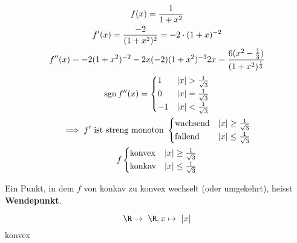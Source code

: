 \begin{bsp*}[note = cont.]
	\begin{gather*}
		f(x) = \frac{1}{1+x^2} \\
		f'(x) = \frac{-2}{(1+x^2)^2} = -2 \cdot (1+x)^{-2} \\
		f''(x) = -2(1+x^2)^{-2} - 2x (-2)(1+x^2)^{-3} 2x = \frac{6(x^2 - \frac{1}{3})}{(1+x^2)^{\frac{1}{3}}} \\
		\sgn f''(x) = \begin{cases}
			1	&\abs{x} > \frac{1}{\sqrt{3}}	\\
			0	&\abs{x} = \frac{1}{\sqrt{3}}	\\
			-1	&\abs{x} < \frac{1}{\sqrt{3}}	
		\end{cases} \\
		\implies f' \text{ ist streng monoton } \begin{cases}
			\text{wachsend}		&\abs{x} \geq \frac{1}{\sqrt{3}}	\\
			\text{fallend}		&\abs{x} \leq \frac{1}{\sqrt{3}}	
		\end{cases} \\
		f \begin{cases}
			\text{konvex}	&\abs{x} \geq \frac{1}{\sqrt{3}}	\\
			\text{konkav}	&\abs{x} \leq \frac{1}{\sqrt{3}} 	
		\end{cases}
	\end{gather*}
\end{bsp*}
\begin{def*}[note = Wendepunkt , index = Wendepunkt]
	Ein Punkt, in dem $f$ von konkav zu konvex wechselt (oder umgekehrt), heisst \textbf{Wendepunkt}. \\
\end{def*}
\begin{bsp*}
	\[ \R \rightarrow \R , x \mapsto \abs{x} \]
	konvex
\end{bsp*}

